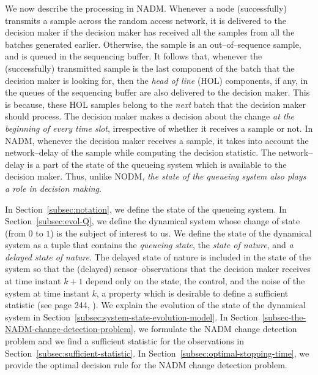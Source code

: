 \documentclass[acmtosn]{acmtrans2m}
\begin{document}
We now describe the processing in {\sf NADM}. Whenever a node (successfully)
transmits a sample across the random access network, it is delivered to 
the decision maker if the decision maker has received all the samples 
from all the batches generated earlier. Otherwise, the sample is an 
out--of--sequence sample, and is queued in the sequencing buffer. It 
follows that, whenever the (successfully) transmitted sample is the 
last component of the batch that the decision maker is looking for, 
then the {\em head of line} (HOL) components, if any, in the queues 
of the sequencing buffer are also delivered to the decision maker. 
This is because, these HOL samples belong to the \emph{next} batch 
that the decision maker should process. The decision maker makes a 
decision about the change {\em at the beginning of every time slot}, 
irrespective of whether it receives a sample or not. In {\sf NADM}, 
whenever the decision maker receives a sample, it takes into account 
the network--delay of the sample while computing the decision statistic. 
The network--delay is a part of the state of the queueing system 
which is available to the decision maker. Thus, unlike NODM, {\em the state of the 
queueing system also plays a role in decision making}. 


In Section~\ref{subsec:notation}, we define the state of the queueing system. 
In Section~\ref{subsec:evol-Q}, we define the dynamical system whose change 
of state (from $0$ to $1$) is the subject of interest to us. We define the 
state of the dynamical system as a tuple that contains 
the {\em queueing state}, the {\em state of nature}, and {\em a delayed state
of nature}. The delayed state of nature is included in the state of the 
system so that the (delayed) sensor--observations that the decision maker 
receives at time instant $k+1$ depend only on the state, the control, and the 
noise of the system at time instant $k$,
a property which is desirable to define a sufficient statistic
(see page 244, \cite{books.bertsekas00a}).
We explain the evolution of the state
of the dynamical system in Section~\ref{subsec:system-state-evolution-model}.
In Section~\ref{subsec-the-NADM-change-detection-problem}, we formulate
the {\sf NADM} change detection problem and we find a sufficient statistic for the 
observations in Section~\ref{subsec:sufficient-statistic}. In 
Section~\ref{subsec:optimal-stopping-time}, we provide the optimal 
decision rule for the {\sf NADM} change detection problem.
\end{document}

